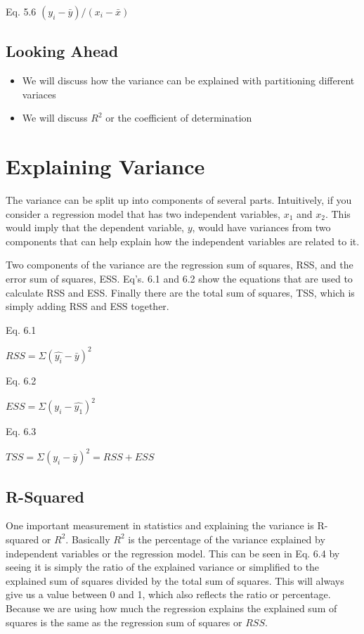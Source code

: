 \documentclass[]{book}
\theoremstyle{definition}
\theoremstyle{definition}
\theoremstyle{definition}
\theoremstyle{remark}
\begin{document}
Eq. 5.6 \((y_{i} - \bar{y})/(x_{i} - \bar{x})\)

\hypertarget{looking-ahead-1}{%
\section{Looking Ahead}\label{looking-ahead-1}}

\begin{itemize}
\item
  We will discuss how the variance can be explained with partitioning
  different variaces
\item
  We will discuss \(R^2\) or the coefficient of determination
\end{itemize}

\hypertarget{explaining-variance}{%
\chapter{Explaining Variance}\label{explaining-variance}}

The variance can be split up into components of several parts.
Intuitively, if you consider a regression model that has two independent
variables, \(x_1\) and \(x_2\). This would imply that the dependent
variable, \(y\), would have variances from two components that can help
explain how the independent variables are related to it.

Two components of the variance are the regression sum of squares, RSS,
and the error sum of squares, ESS. Eq's. 6.1 and 6.2 show the equations
that are used to calculate RSS and ESS. Finally there are the total sum
of squares, TSS, which is simply adding RSS and ESS together.

Eq. 6.1

\(RSS = \Sigma(\hat{y_i} - \bar{y})^2\)

Eq. 6.2

\(ESS = \Sigma(y_i - \hat{y_1})^2\)

Eq. 6.3

\(TSS = \Sigma(y_i - \bar{y})^2 = RSS + ESS\)

\hypertarget{r-squared}{%
\section{R-Squared}\label{r-squared}}

One important measurement in statistics and explaining the variance is
R-squared or \(R^2\). Basically \(R^2\) is the percentage of the
variance explained by independent variables or the regression model.
This can be seen in Eq. 6.4 by seeing it is simply the ratio of the
explained variance or simplified to the explained sum of squares divided
by the total sum of squares. This will always give us a value between 0
and 1, which also reflects the ratio or percentage. Because we are using
how much the regression explains the explained sum of squares is the
same as the regression sum of squares or \(RSS\).
\end{document}

